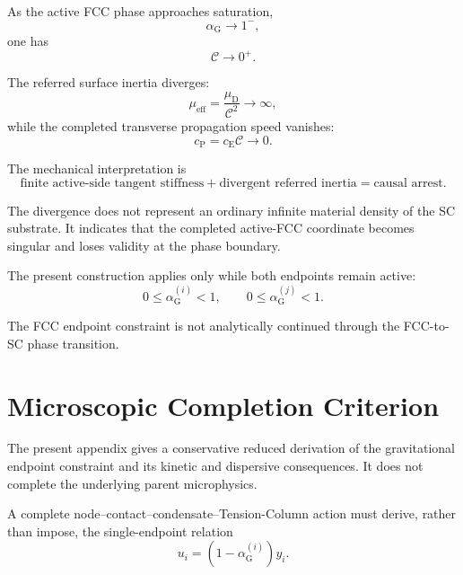 As the active FCC phase approaches saturation,
\begin{equation}
    \alpha_{\mathrm{G}} \rightarrow 1^{-},
\end{equation}
one has
\begin{equation}
    \mathcal{C} \rightarrow 0^{+}.
\end{equation}

The referred surface inertia diverges:
\begin{equation}
    \mu_{\mathrm{eff}} = \frac{\mu_{\mathrm{D}}}{\mathcal{C}^2} \rightarrow \infty,
\end{equation}
while the completed transverse propagation speed vanishes:
\begin{equation}
    c_{\mathrm{P}} = c_{\mathrm{E}}\mathcal{C} \rightarrow 0.
\end{equation}

The mechanical interpretation is
\begin{equation}
    \text{finite active-side tangent stiffness} + \text{divergent referred inertia} = \text{causal arrest}.
\end{equation}

The divergence does not represent an ordinary infinite material density of the SC substrate. It indicates that the completed active-FCC coordinate becomes singular and loses validity at the phase boundary.

The present construction applies only while both endpoints remain active:
\begin{equation}
    0 \leq \alpha_{\mathrm{G}}^{(i)} < 1, \qquad 0 \leq \alpha_{\mathrm{G}}^{(j)} < 1.
\end{equation}

The FCC endpoint constraint is not analytically continued through the FCC-to-SC phase transition.

\section{Microscopic Completion Criterion}
\label{sec:grav_microscopic_completion}

The present appendix gives a conservative reduced derivation of the gravitational endpoint constraint and its kinetic and dispersive consequences. It does not complete the underlying parent microphysics.

A complete node--contact--condensate--Tension-Column action must derive, rather than impose, the single-endpoint relation
\begin{equation}
    u_{i} = \left( 1-\alpha_{\mathrm{G}}^{(i)} \right)y_{i}.
\end{equation}

